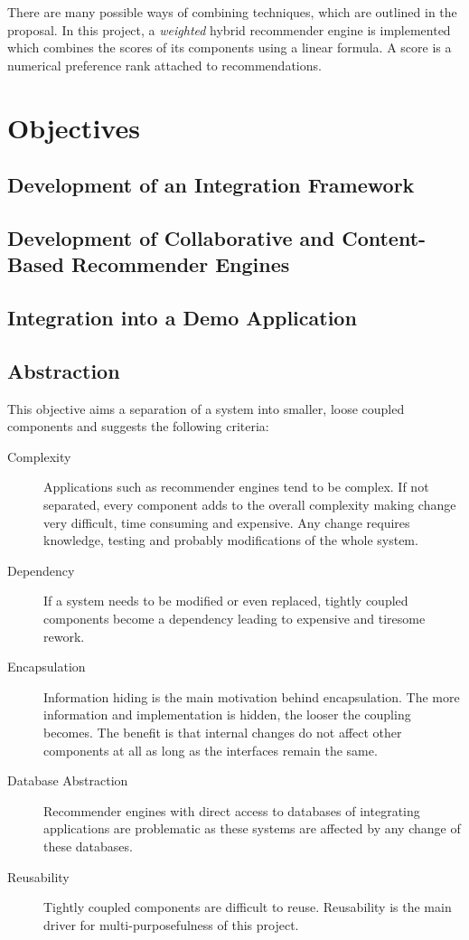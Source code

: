 There are many possible ways of combining techniques, which are outlined in the proposal. In this project, a \emph{weighted} hybrid recommender engine is implemented which combines the scores of its components using a linear formula. A score is a numerical preference rank attached to recommendations.

\section{Objectives}
\label{intro-objectives}

\subsection{Development of an Integration Framework}
\label{intro-objectives-framework}

\subsection{Development of Collaborative and Content-Based Recommender Engines}
\label{intro-objectives-engines}

\subsection{Integration into a Demo Application}
\label{intro-objectives-demo}

\subsection{Abstraction}
\label{intro-objectives-abstraction}

This objective aims a separation of a system into smaller, loose coupled components and suggests the following criteria:

\begin{description}
    \item[Complexity] Applications such as recommender engines tend to be complex. If not separated, every component adds to the overall complexity making change very difficult, time consuming and expensive. Any change requires knowledge, testing and probably modifications of the whole system.
    \item[Dependency] If a system needs to be modified or even replaced, tightly coupled components become a dependency leading to expensive and tiresome rework.
    \item[Encapsulation] Information hiding is the main motivation behind encapsulation. The more information and implementation is hidden, the looser the coupling becomes. The benefit is that internal changes do not affect other components at all as long as the interfaces remain the same.
    \item[Database Abstraction] Recommender engines with direct access to databases of integrating applications are problematic as these systems are affected by any change of these databases.
    \item[Reusability] Tightly coupled components are difficult to reuse. Reusability is the main driver for multi-purposefulness of this project.
\end{description}

